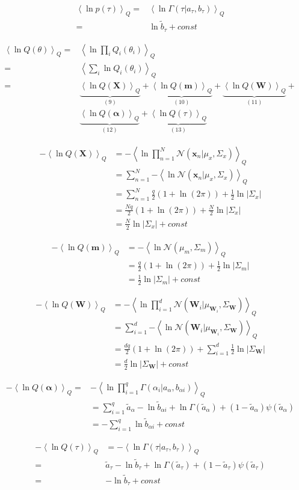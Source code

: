 \documentclass[10pt]{article}
\newcommand{\Angle}[1]{\left \langle #1 \right \rangle}
\newcommand{\Eq}[1]{\Angle{#1}_Q}
\newcommand{\N}[2][]{\mathcal{N} \left( #1,#2 \right)}
\newcommand{\Det}[1]{\left| #1 \right|}
\begin{document}
	\begin{align}
		\Eq{\ln{p(\tau)}}=&\Eq{\ln{\Gamma(\tau \vert a_\tau,b_\tau)}}\\
		=&\ln{\tilde{b}_\tau} + const
	\end{align}

	
	\begin{align}
		\Eq{\ln{Q(\theta)}}=&\Eq{\ln{\prod_i{Q_i(\theta_i)}}} \\
		=&\Eq{\sum_i{\ln{Q_i(\theta_i)}}} \\
		=&\underbrace{\Eq{\ln{Q(\bm{X})}}}_{(9)} + \underbrace{\Eq{\ln{Q(\bm{m})}}}_{(10)} + \underbrace{\Eq{\ln{Q(\bm{W})}}}_{(11)} + \\
		& \underbrace{\Eq{\ln{Q(\bm{\alpha})}}}_{(12)} +\underbrace{\Eq{\ln{Q(\tau)}}}_{(13)} \nonumber
	\end{align}

	\begin{align}
		-\Eq{\ln{Q(\bm{X})}}&=-\Eq{\ln{\prod_{n=1}^N{\N[\bm{x}_n \vert \mu_x]{\Sigma_x}}}} \\
		&=\sum_{n=1}^N{-\Eq{\ln{\N[\bm{x}_n \vert \mu_x]{\Sigma_x}}}} \\
		&=\sum_{n=1}^N{\frac{q}{2}(1+\ln(2\pi)) + \frac{1}{2}\ln{\Det{\Sigma_x}}} \\
		&=\frac{Nq}{2}( 1+\ln(2\pi)) + \frac{N}{2}\ln{\Det{\Sigma_x}} \\
		&=\frac{N}{2}\ln{\Det{\Sigma_x}} + const
	\end{align}
	
	\begin{align}
		-\Eq{\ln{Q(\bm{m})}}&=-\Eq{\ln{\N[\mu_m]{\Sigma_m}}} \\
		&=\frac{q}{2}( 1+\ln(2\pi)) + \frac{1}{2}\ln{\Det{\Sigma_m}} \\
		&=\frac{1}{2}\ln{\Det{\Sigma_m}} + const
	\end{align}

	\begin{align}
		-\Eq{\ln{Q(\bm{W})}}&=-\Eq{\ln{\prod_{i=1}^d{\N[\bm{W}_i \vert \mu_{\bm{W}_i}]{\Sigma_{\bm{W}}}}}} \\
		&=\sum_{i=1}^d{-\Eq{\ln{\N[{\bm{W}_i} \vert \mu_{\bm{W}_i}]{\Sigma_{\bm{W}}}}}} \\
		&=\frac{dq}{2}(1+\ln(2\pi)) + \sum_{i=1}^d{\frac{1}{2}\ln{\Det{\Sigma_{\bm{W}}}}} \\
		&=\frac{d}{2}\ln{\Det{\Sigma_{\bm{W}}}} + const
	\end{align}
	
	\begin{align}
		-\Eq{\ln{Q(\bm{\alpha})}}=&-\Eq{\ln{\prod_{i=1}^q \Gamma(\alpha_i \vert a_\alpha,b_{\alpha i})}} \\
				&=\sum_{i=1}^q \tilde{a}_\alpha-\ln{\tilde{b}_{\alpha i}}+\ln{\Gamma(\tilde{a}_\alpha)}+(1-\tilde{a}_\alpha)\psi(\tilde{a}_\alpha) \\
				&=-\sum_{i=1}^q \ln{\tilde{b}_{\alpha i}} + const
	\end{align}		
	
	\begin{align}
		-\Eq{\ln{Q(\tau)}}&=-\Eq{\ln{\Gamma(\tau \vert a_\tau,b_\tau)}} \\
		=&\tilde{a}_\tau-\ln{\tilde{b}_\tau}+\ln{\Gamma(\tilde{a}_\tau)}+(1-\tilde{a}_\tau)\psi(\tilde{a}_\tau) \\
		=&-\ln{\tilde{b}_\tau} + const
	\end{align}
	
\end{document}
